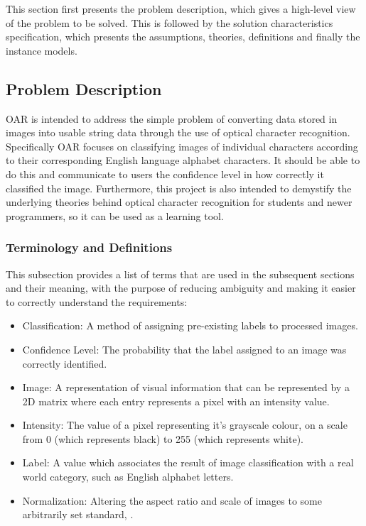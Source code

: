 \documentclass[12pt]{article}
\begin{document}
This section first presents the problem description, which gives a high-level
view of the problem to be solved.  This is followed by the solution characteristics
specification, which presents the assumptions, theories, definitions and finally
the instance models.  

\subsection{Problem Description} \label{Sec_pd}

OAR is intended to address the simple problem of converting data stored in images into usable string data through the use of optical
character recognition. Specifically OAR focuses on classifying images of individual characters according to their corresponding 
English language alphabet characters. It should be able to do this and communicate to users the confidence level in how correctly it 
classified the image. Furthermore, this project is also intended to demystify the underlying theories behind optical character 
recognition for students and newer programmers, so it can be used as a learning tool.

\subsubsection{Terminology and  Definitions}

This subsection provides a list of terms that are used in the subsequent
sections and their meaning, with the purpose of reducing ambiguity and making it
easier to correctly understand the requirements:

\begin{itemize}

\item Classification: A method of assigning pre-existing labels to processed images.
\item Confidence Level: The probability that the label assigned to an image was correctly identified.
\item Image: A representation of visual information that can be represented by a 2D matrix where each entry represents a pixel with an intensity value.
\item Intensity: The value of a pixel representing it's grayscale colour, on a scale from 0 (which represents black) to 255 (which represents white).
\item Label: A value which associates the result of image classification with a real world category, such as English alphabet letters.
\item Normalization: Altering the aspect ratio and scale of images to some arbitrarily set standard, \cite{Karandish2022}.


\end{itemize}
\end{document}
